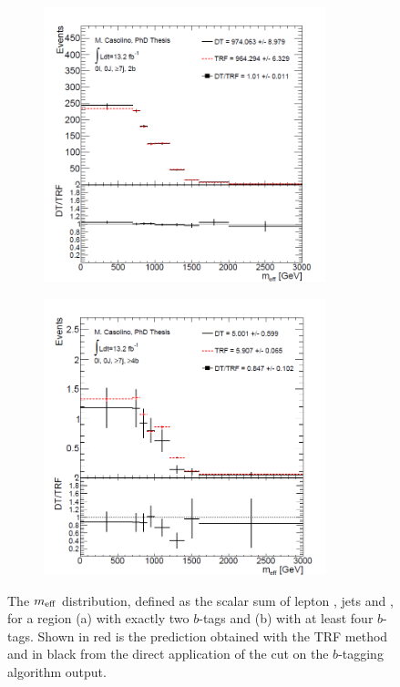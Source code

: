 \begin{figure}[htb!]
\begin{subfigure}{0.5\textwidth}
  \centering
  \includegraphics[width=0.9\textwidth]{figures/Datasamples/ttbarlight_meff_c0l0RCTTMass7j2b.png}
  \caption{}
  \label{fig:dat:trf:regiontwob}
\end{subfigure}
\begin{subfigure}{0.5\textwidth}
  \centering
  \includegraphics[width=0.9\textwidth]{figures/Datasamples/ttbarlight_meff_c0l0RCTTMass7j4b.png}
  \caption{}
  \label{fig:dat:trf:regionfourb}
\end{subfigure}

\captionsetup{width=0.85\textwidth} \caption{\small The $m_{\rm eff}$ distribution, defined as the scalar sum of lepton \pt, jets \pt and \MET, for a region (a) with exactly two $b$-tags and (b) with at least four $b$-tags. Shown in red is the prediction obtained with the TRF method and in black from the direct application of the cut on the $b$-tagging algorithm output.}
\label{fig:dat:trf:ttlight}
\end{figure}